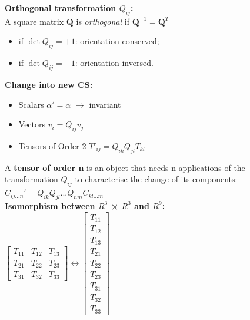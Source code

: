 \textbf{Orthogonal transformation $Q_{ij}$:} \\
A square matrix $\mathbf{Q}$ is \textit{orthogonal} if $\mathbf{Q}^{-1} = \mathbf{Q}^T$
\begin{itemize}
\item if $ \det{Q_{ij}} = +1$: orientation conserved;
\item if $ \det{Q_{ij}} = -1$: orientation inversed.
\end{itemize}

\textbf{Change into new CS:}
\begin{itemize}
\item Scalars $\alpha ' = \alpha$ $\rightarrow$ invariant
\item Vectors $v_i = Q_{ij}v_j$
\item Tensors of Order 2 $T'_{ij} = Q_{ik}Q_{jl}T_{kl}$
\end{itemize}

A \textbf{tensor of order n} is an object that needs n applications of the transformation $Q_{ij}$ to characterise the change of its components:
$C_{ij...n} '= Q_{ik} Q_{jl} ... Q_{nm} C_{kl...m}$ \\

\textbf{Isomorphism between $R^3$ × $R^3$ and $R^9$:} \\
$ \left[\begin{array}{ccc}T_{11} & T_{12} & T_{13} \\T_{21} & T_{22} & T_{23} \\T_{31} & T_{32} & T_{33}\end{array}\right] \leftrightarrow \left[\begin{array}{c}T_{11} \\T_{12} \\T_{13} \\T_{21} \\T_{22} \\T_{23} \\T_{31} \\T_{32} \\T_{33}\end{array}\right] $